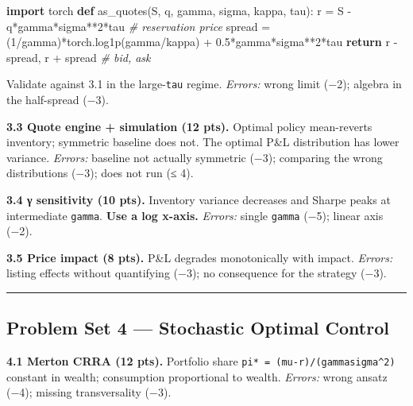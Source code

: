 \documentclass[
]{article}
\newenvironment{Shaded}{}{}
\newcommand{\CommentTok}[1]{\textcolor[rgb]{0.38,0.63,0.69}{\textit{#1}}}
\newcommand{\ControlFlowTok}[1]{\textcolor[rgb]{0.00,0.44,0.13}{\textbf{#1}}}
\newcommand{\DecValTok}[1]{\textcolor[rgb]{0.25,0.63,0.44}{#1}}
\newcommand{\FloatTok}[1]{\textcolor[rgb]{0.25,0.63,0.44}{#1}}
\newcommand{\ImportTok}[1]{\textcolor[rgb]{0.00,0.50,0.00}{\textbf{#1}}}
\newcommand{\KeywordTok}[1]{\textcolor[rgb]{0.00,0.44,0.13}{\textbf{#1}}}
\newcommand{\NormalTok}[1]{#1}
\newcommand{\OperatorTok}[1]{\textcolor[rgb]{0.40,0.40,0.40}{#1}}
\begin{document}
\begin{Shaded}
\begin{Highlighting}[]
\ImportTok{import}\NormalTok{ torch}
\KeywordTok{def}\NormalTok{ as\_quotes(S, q, gamma, sigma, kappa, tau):}
\NormalTok{    r }\OperatorTok{=}\NormalTok{ S }\OperatorTok{{-}}\NormalTok{ q}\OperatorTok{*}\NormalTok{gamma}\OperatorTok{*}\NormalTok{sigma}\OperatorTok{**}\DecValTok{2}\OperatorTok{*}\NormalTok{tau                 }\CommentTok{\# reservation price}
\NormalTok{    spread }\OperatorTok{=}\NormalTok{ (}\DecValTok{1}\OperatorTok{/}\NormalTok{gamma)}\OperatorTok{*}\NormalTok{torch.log1p(gamma}\OperatorTok{/}\NormalTok{kappa) }\OperatorTok{+} \FloatTok{0.5}\OperatorTok{*}\NormalTok{gamma}\OperatorTok{*}\NormalTok{sigma}\OperatorTok{**}\DecValTok{2}\OperatorTok{*}\NormalTok{tau}
    \ControlFlowTok{return}\NormalTok{ r }\OperatorTok{{-}}\NormalTok{ spread, r }\OperatorTok{+}\NormalTok{ spread                }\CommentTok{\# bid, ask}
\end{Highlighting}
\end{Shaded}

Validate against 3.1 in the large-\texttt{tau} regime. \emph{Errors:}
wrong limit (−2); algebra in the half-spread (−3).

\textbf{3.3 Quote engine + simulation (12 pts).} Optimal policy
mean-reverts inventory; symmetric baseline does not. The optimal P\&L
distribution has lower variance. \emph{Errors:} baseline not actually
symmetric (−3); comparing the wrong distributions (−3); does not run (≤
4).

\textbf{3.4 γ sensitivity (10 pts).} Inventory variance decreases and
Sharpe peaks at intermediate \texttt{gamma}. \textbf{Use a log x-axis.}
\emph{Errors:} single \texttt{gamma} (−5); linear axis (−2).

\textbf{3.5 Price impact (8 pts).} P\&L degrades monotonically with
impact. \emph{Errors:} listing effects without quantifying (−3); no
consequence for the strategy (−3).

\begin{center}\rule{0.5\linewidth}{0.5pt}\end{center}

\subsection{Problem Set 4 --- Stochastic Optimal
Control}\label{problem-set-4-stochastic-optimal-control}

\textbf{4.1 Merton CRRA (12 pts).} Portfolio share
\texttt{pi*\ =\ (mu-r)/(gammasigma\^{}2)} constant in wealth;
consumption proportional to wealth. \emph{Errors:} wrong ansatz (−4);
missing transversality (−3).
\end{document}
